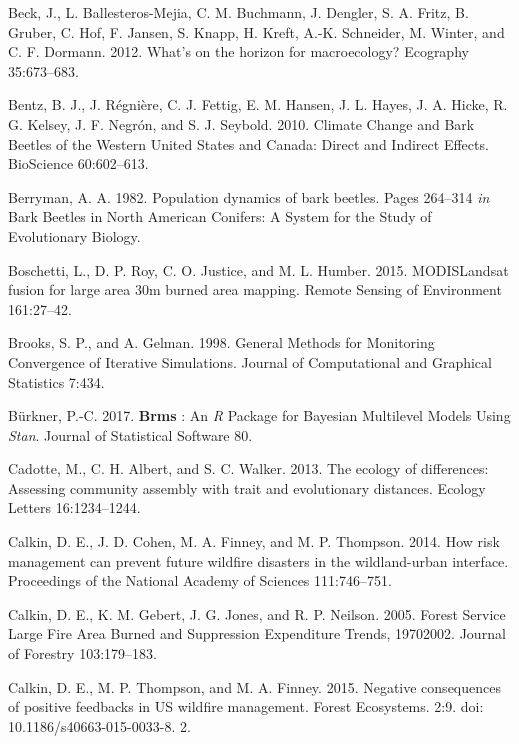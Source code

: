 \documentclass[twoside,12pt,final]{ucthesis-CA2012}
\begin{document}
\begin{ucmainmatter}
\hypertarget{ref-beck2012}{}
Beck, J., L. Ballesteros-Mejia, C. M. Buchmann, J. Dengler, S. A. Fritz,
B. Gruber, C. Hof, F. Jansen, S. Knapp, H. Kreft, A.-K. Schneider, M.
Winter, and C. F. Dormann. 2012. What's on the horizon for macroecology?
Ecography 35:673--683.

\hypertarget{ref-bentz2010}{}
Bentz, B. J., J. Régnière, C. J. Fettig, E. M. Hansen, J. L. Hayes, J.
A. Hicke, R. G. Kelsey, J. F. Negrón, and S. J. Seybold. 2010. Climate
Change and Bark Beetles of the Western United States and Canada: Direct
and Indirect Effects. BioScience 60:602--613.

\hypertarget{ref-berryman1982}{}
Berryman, A. A. 1982. Population dynamics of bark beetles. Pages
264--314 \emph{in} Bark Beetles in North American Conifers: A System for
the Study of Evolutionary Biology.

\hypertarget{ref-boschetti2015}{}
Boschetti, L., D. P. Roy, C. O. Justice, and M. L. Humber. 2015.
MODISLandsat fusion for large area 30m burned area mapping. Remote
Sensing of Environment 161:27--42.

\hypertarget{ref-brooks1998}{}
Brooks, S. P., and A. Gelman. 1998. General Methods for Monitoring
Convergence of Iterative Simulations. Journal of Computational and
Graphical Statistics 7:434.

\hypertarget{ref-burkner2017}{}
Bürkner, P.-C. 2017. \textbf{Brms} : An \emph{R} Package for Bayesian
Multilevel Models Using \emph{Stan}. Journal of Statistical Software 80.

\hypertarget{ref-cadotte2013}{}
Cadotte, M., C. H. Albert, and S. C. Walker. 2013. The ecology of
differences: Assessing community assembly with trait and evolutionary
distances. Ecology Letters 16:1234--1244.

\hypertarget{ref-calkin2014}{}
Calkin, D. E., J. D. Cohen, M. A. Finney, and M. P. Thompson. 2014. How
risk management can prevent future wildfire disasters in the
wildland-urban interface. Proceedings of the National Academy of
Sciences 111:746--751.

\hypertarget{ref-calkin2005}{}
Calkin, D. E., K. M. Gebert, J. G. Jones, and R. P. Neilson. 2005.
Forest Service Large Fire Area Burned and Suppression Expenditure
Trends, 19702002. Journal of Forestry 103:179--183.

\hypertarget{ref-calkin2015}{}
Calkin, D. E., M. P. Thompson, and M. A. Finney. 2015. Negative
consequences of positive feedbacks in US wildfire management. Forest
Ecosystems. 2:9. doi: 10.1186/s40663-015-0033-8. 2.


\end{ucmainmatter}
\end{document}
